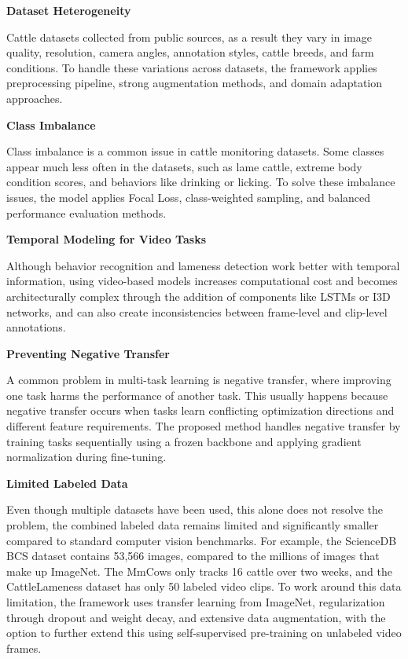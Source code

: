 \textbf{Dataset Heterogeneity}

Cattle datasets collected from public sources, as a result they vary in image quality, resolution, camera angles, annotation styles, cattle breeds, and farm conditions. To handle these variations across datasets, the framework applies preprocessing pipeline, strong augmentation methods, and domain adaptation approaches.


\textbf{Class Imbalance}

Class imbalance is a common issue in cattle monitoring datasets. Some classes appear much less often in the datasets, such as lame cattle, extreme body condition scores, and behaviors like drinking or licking. To solve these imbalance issues, the model applies Focal Loss, class-weighted sampling, and balanced performance evaluation methods.


\textbf{Temporal Modeling for Video Tasks}

Although behavior recognition and lameness detection work better with temporal information, using video-based models increases computational cost and becomes architecturally complex through the addition of components like LSTMs or I3D networks, and can also create inconsistencies between frame-level and clip-level annotations.


\textbf{Preventing Negative Transfer}

A common problem in multi-task learning is negative transfer, where improving one task harms the performance of another task. This usually happens because negative transfer occurs when tasks learn conflicting optimization directions and different feature requirements. The proposed method handles negative transfer by training tasks sequentially using a frozen backbone and applying gradient normalization during fine-tuning.


\textbf{Limited Labeled Data}

Even though multiple datasets have been used, this alone does not resolve the problem, the combined labeled data remains limited and significantly smaller compared to standard computer vision benchmarks. For example, the ScienceDB BCS dataset contains 53,566 images, compared to the millions of images that make up ImageNet. The MmCows only tracks 16 cattle over two weeks, and the CattleLameness dataset has only 50 labeled video clips. To work around this data limitation, the framework uses transfer learning from ImageNet, regularization through dropout and weight decay, and extensive data augmentation, with the option to further extend this using self-supervised pre-training on unlabeled video frames.

